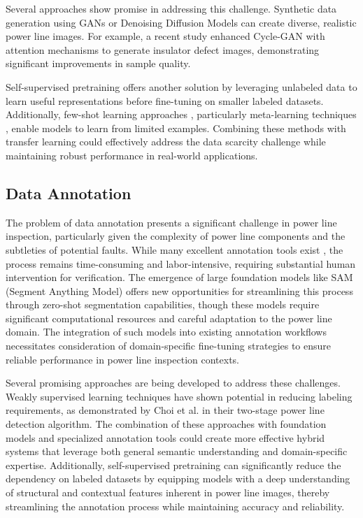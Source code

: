 Several approaches show promise in addressing this challenge. Synthetic data generation using GANs \cite{goodfellow2020generative} or Denoising Diffusion Models can create diverse, realistic power line images. For example, a recent study \cite{YE2024100250} enhanced Cycle-GAN \cite{zhu2017unpaired} with attention mechanisms to generate insulator defect images, demonstrating significant improvements in sample quality.

Self-supervised pretraining \cite{raina2007self} offers another solution by leveraging unlabeled data to learn useful representations before fine-tuning on smaller labeled datasets. Additionally, few-shot learning approaches \cite{wang2020generalizing}, particularly meta-learning techniques \cite{finn2017model}, enable models to learn from limited examples. Combining these methods with transfer learning could effectively address the data scarcity challenge while maintaining robust performance in real-world applications.

\subsection{Data Annotation}

The problem of data annotation presents a significant challenge in power line inspection, particularly given the complexity of power line components and the subtleties of potential faults. While many excellent annotation tools exist \cite{dwyer2024roboflow, HumanSignal, labelstudio}, the process remains time-consuming and labor-intensive, requiring substantial human intervention for verification. 
The emergence of large foundation models like SAM (Segment Anything Model) \cite{kirillov2023segment} offers new opportunities for streamlining this process through zero-shot segmentation capabilities, though these models require significant computational resources and careful adaptation to the power line domain. The integration of such models into existing annotation workflows necessitates consideration of domain-specific fine-tuning strategies to ensure reliable performance in power line inspection contexts.

Several promising approaches are being developed to address these challenges. Weakly supervised learning techniques \cite{zhou2018brief} have shown potential in reducing labeling requirements, as demonstrated by Choi et al. \cite{choi2021weakly} in their two-stage power line detection algorithm. The combination of these approaches with foundation models and specialized annotation tools could create more effective hybrid systems that leverage both general semantic understanding and domain-specific expertise. Additionally, self-supervised pretraining \cite{raina2007self} can significantly reduce the dependency on labeled datasets by equipping models with a deep understanding of structural and contextual features inherent in power line images, thereby streamlining the annotation process while maintaining accuracy and reliability.

